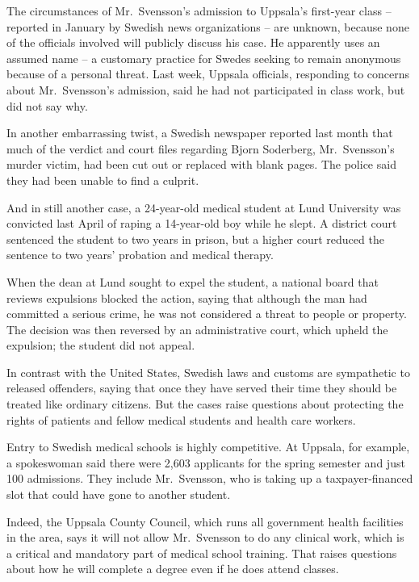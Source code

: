 \documentclass[12pt,a4paper,onecolumn]{article}
\begin{document}
\begin{CJK*}{GBK}{song}
The circumstances of Mr.~Svensson's admission to Uppsala's first-year class -- reported in January
by Swedish news organizations -- are unknown, because none of the officials involved will publicly
discuss his case. He apparently uses an assumed name -- a customary practice for Swedes seeking to
remain anonymous because of a personal threat. Last week, Uppsala officials, responding to concerns
about Mr.~Svensson's admission, said he had not participated in class work, but did not say why.

In another embarrassing twist, a Swedish newspaper reported last month that much of the verdict and
court files regarding Bjorn Soderberg, Mr.~Svensson's murder victim, had been cut out or replaced
with blank pages. The police said they had been unable to find a culprit.

And in still another case, a 24-year-old medical student at Lund University was convicted last April
of raping a 14-year-old boy while he slept. A district court sentenced the student to two years in
prison, but a higher court reduced the sentence to two years' probation and medical therapy.

When the dean at Lund sought to expel the student, a national board that reviews expulsions blocked
the action, saying that although the man had committed a serious crime, he was not considered a
threat to people or property. The decision was then reversed by an administrative court, which
upheld the expulsion; the student did not appeal.

In contrast with the United States, Swedish laws and customs are sympathetic to released offenders,
saying that once they have served their time they should be treated like ordinary citizens. But the
cases raise questions about protecting the rights of patients and fellow medical students and health
care workers.

Entry to Swedish medical schools is highly competitive. At Uppsala, for example, a spokeswoman said
there were 2,603 applicants for the spring semester and just 100 admissions. They include
Mr.~Svensson, who is taking up a taxpayer-financed slot that could have gone to another student.

Indeed, the Uppsala County Council, which runs all government health facilities in the area, says it
will not allow Mr.~Svensson to do any clinical work, which is a critical and mandatory part of
medical school training. That raises questions about how he will complete a degree even if he does
attend classes.


\end{CJK*}
\end{document}
